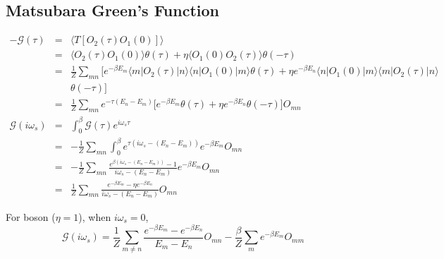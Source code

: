 \documentclass[12pt]{book}
\begin{document}
	\subsection{Matsubara Green's Function}
	\begin{eqnarray}
		-\mathcal G(\tau)&=&\langle T[O_2(\tau)O_1(0)]\rangle\\
		&=&\langle O_2(\tau)O_1(0)\rangle\theta(\tau)+\eta\langle O_1(0)O_2(\tau)\rangle\theta(-\tau)\\
		&=&\frac 1Z\sum_{mn}\big[e^{-\beta E_m}\langle m|O_2(\tau)|n\rangle\langle n|O_1(0)|m\rangle\theta(\tau)+\eta e^{-\beta E_n}\langle n|O_1(0)|m\rangle\langle m|O_2(\tau)|n\rangle\nonumber\\
		&&\theta(-\tau)\big]\\
		&=&\frac 1Z\sum_{mn}e^{-\tau (E_n-E_m)}\big[e^{-\beta E_m}\theta(\tau)+\eta e^{-\beta E_n}\theta(-\tau)\big]O_{mn}\\
		\mathcal G(i\omega_s)&=&\int_0^\beta \mathcal G(\tau) e^{i\omega_s\tau}\\
		&=&-\frac 1Z\sum_{mn}\int_0^\beta e^{\tau (i\omega_s-(E_n-E_m))}e^{-\beta E_m}O_{mn}\\
		&=&-\frac 1Z\sum_{mn}\frac {e^{\beta (i\omega_s-(E_n-E_m))}-1}{i\omega_s-(E_n-E_m)}e^{-\beta E_m}O_{mn}\\
		&=&\frac 1Z\sum_{mn}\frac {e^{-\beta E_m}-\eta e^{-\beta E_n}}{i\omega_s-(E_n-E_m)}O_{mn}
	\end{eqnarray}
	
	For boson ($\eta=1$), when $i\omega_s=0$,
	\begin{equation}
		\mathcal G(i\omega_s)=\frac 1Z\sum_{m\neq n}\frac {e^{-\beta E_m}-e^{-\beta E_n}}{E_m-E_n}O_{mn}-\frac \beta Z\sum_{m}e^{-\beta E_m}O_{mm}
	\end{equation}
\end{document}
